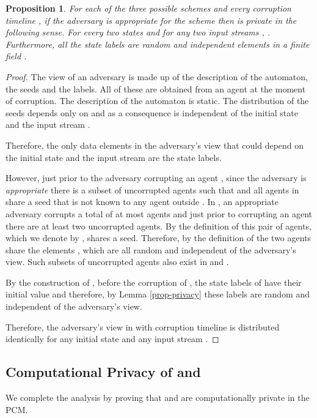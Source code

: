 \documentclass[letterpaper,11pt]{article}
\newtheorem{proposition}[theorem]{Proposition}
\begin{document}
\begin{proposition}
\label{prop:priv_intermediate}
For each of the three possible schemes  and every corruption timeline , if the adversary is appropriate for the scheme   then  is private in the following sense. For  every two states  and for any two input streams ,
. Furthermore, all the state labels are random and independent elements in a finite field .
\end{proposition}
\begin{proof}
The view of an adversary  is made up of the description of the automaton, the seeds and the labels. All of these are obtained from an agent at the moment of corruption. The description of the automaton is static. The distribution of the seeds depends only on  and as a consequence is independent of the initial state  and the input stream .

Therefore, the only data elements in the adversary's view that could depend on the initial state and the input stream are the state labels. 

However, just prior to the adversary corrupting an agent , since the adversary is {\em appropriate} there is a subset of uncorrupted agents  such that  and all agents in  share a seed that is not known to any agent outside . In , an appropriate adversary corrupts a total of at most  agents and just prior to corrupting an agent there are at least two uncorrupted agents. By the definition of  this pair of agents, which we denote by , shares a seed. Therefore, by the definition of  the two agents share the elements , which are all random and independent of the adversary's view. Such subsets  of uncorrupted agents also exist in  and . 

By the construction of , before the corruption of , the state labels of  have their initial value  and therefore, by Lemma \ref{prop-privacy} these labels are random and independent of the adversary's view.

Therefore, the adversary's view in  with corruption timeline  is distributed identically for any initial state  and any input stream .
\end{proof}

\subsection{Computational Privacy of  and }

We complete the analysis by proving that  and  are computationally private in the PCM. 
\end{document}
